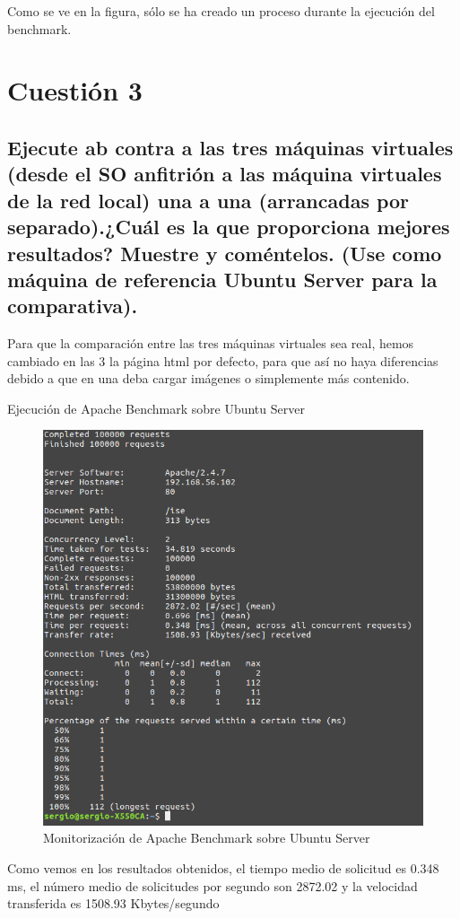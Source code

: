 Como se ve en la figura, sólo se ha creado un proceso durante la ejecución del benchmark.


\section{Cuestión 3}

\subsection{Ejecute ab contra a las tres máquinas virtuales (desde el SO anfitrión a las máquina virtuales de la red local) una a una (arrancadas por separado).¿Cuál es la que proporciona mejores resultados? Muestre y coméntelos. (Use como máquina de referencia Ubuntu Server para la comparativa). }

Para que la comparación entre las tres máquinas virtuales sea real, hemos cambiado en las 3 la página html por defecto, para que así no haya diferencias debido a que en una deba cargar imágenes o simplemente más contenido.

Ejecución de Apache Benchmark sobre Ubuntu Server
\begin{figure}[H] %
	\centering
	\includegraphics[scale=0.5]{imagenes/ab-us.png}  %
	\caption{Monitorización de Apache Benchmark sobre Ubuntu Server}
\end{figure}
Como vemos en los resultados obtenidos, el tiempo medio de solicitud es 0.348 ms, el número medio de solicitudes por segundo son 2872.02 y la velocidad transferida es 1508.93 Kbytes/segundo


